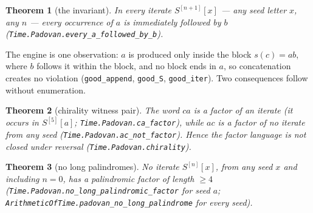 \documentclass[11pt]{amsart}
\theoremstyle{plain}
\newtheorem{theorem}{Theorem}[section]
\theoremstyle{definition}
\theoremstyle{remark}
\begin{document}
\begin{theorem}[the invariant]\label{thm:invariant}
In every iterate $S^{[n+1]}[x]$ --- any seed letter $x$, any $n$ --- every occurrence of $a$
is immediately followed by $b$ \textup{(\texttt{Time.Padovan.every\_a\_followed\_by\_b})}.
\end{theorem}

The engine is one observation: $a$ is produced only inside the block $s(c) = ab$, where $b$
follows it within the block, and no block ends in $a$, so concatenation creates no violation
(\texttt{good\_append}, \texttt{good\_S}, \texttt{good\_iter}). Two consequences follow
without enumeration.

\begin{theorem}[chirality witness pair]\label{thm:chirality}
The word $ca$ is a factor of an iterate \textup{(}it occurs in $S^{[5]}[a]$;
\texttt{Time.Padovan.ca\_factor}\textup{)}, while $ac$ is a factor of \emph{no} iterate from
\emph{any} seed \textup{(\texttt{Time.Padovan.ac\_not\_factor})}. Hence the factor language
is not closed under reversal \textup{(\texttt{Time.Padovan.chirality})}.
\end{theorem}

\begin{theorem}[no long palindromes]\label{thm:nopalindrome}
No iterate $S^{[n]}[x]$, from any seed $x$ and including $n = 0$, has a palindromic factor of
length $\ge 4$ \textup{(\texttt{Time.Padovan.no\_long\_palindromic\_factor} for seed $a$;
\texttt{ArithmeticOfTime.padovan\_no\_long\_palindrome} for every seed)}.
\end{theorem}
\end{document}
